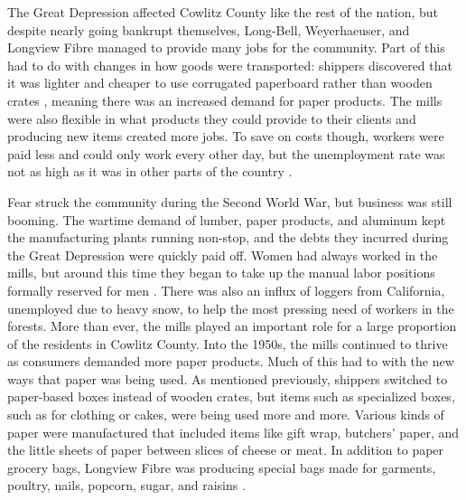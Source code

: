 The Great Depression affected Cowlitz County like the rest of the nation, but despite nearly going bankrupt themselves, Long-Bell, Weyerhaeuser, and Longview Fibre managed to provide many jobs for the community. Part of this had to do with changes in how goods were transported: shippers discovered that it was lighter and cheaper to use corrugated paperboard rather than wooden crates \citep[69]{wilma_2017}, meaning there was an increased demand for paper products. The mills were also flexible in what products they could provide to their clients and producing new items created more jobs. To save on costs though, workers were paid less and could only work every other day, but the unemployment rate was not as high as it was in other parts of the country \citep[167]{urrutia_1998}.

Fear struck the community during the Second World War, but business was still booming. The wartime demand of lumber, paper products, and aluminum kept the manufacturing plants running non-stop, and the debts they incurred during the Great Depression were quickly paid off. Women had always worked in the mills, but around this time they began to take up the manual labor positions formally reserved for men \citep[132]{wilma_2017}. There was also an influx of loggers from California, unemployed due to heavy snow, to help the most pressing need of workers in the forests. More than ever, the mills played an important role for a large proportion of the residents in Cowlitz County.
Into the 1950s, the mills continued to thrive as consumers demanded more paper products. Much of this had to with the new ways that paper was being used. As mentioned previously, shippers switched to paper-based boxes instead of wooden crates, but items such as specialized boxes, such as for clothing or cakes, were being used more and more. Various kinds of paper were manufactured that included items like gift wrap, butchers' paper, and the little sheets of paper between slices of cheese or meat. In addition to paper grocery bags, Longview Fibre was producing special bags made for garments, poultry, nails, popcorn, sugar, and raisins \citep[122-123]{wilma_2017}.

